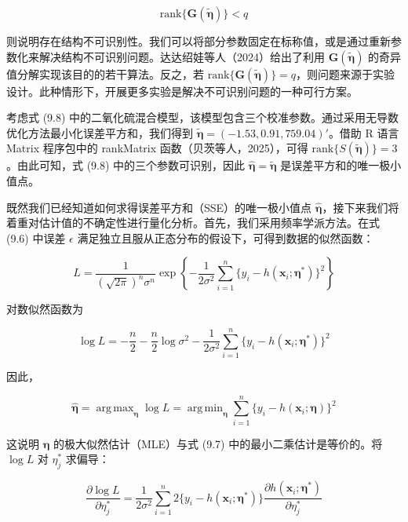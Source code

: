 \documentclass{ctexart}
\DeclareMathOperator*{\argmin}{arg\,min}
\DeclareMathOperator*{\argmax}{arg\,max}
\begin{document}
\begin{equation*}
\mathrm{rank}\{\boldsymbol{G}(\widetilde{\boldsymbol{\eta}})\}<q
\end{equation*}

则说明存在结构不可识别性。我们可以将部分参数固定在标称值，或是通过重新参数化来解决结构不可识别问题。达达绍娃等人（2024）给出了利用 $\boldsymbol{G}(\widetilde{\boldsymbol{\eta}})$ 的奇异值分解实现该目的的若干算法。反之，若 $\mathrm{rank}\{\boldsymbol{G}(\widetilde{\boldsymbol{\eta}})\}=q$，则问题来源于实验设计。此种情形下，开展更多实验是解决不可识别问题的一种可行方案。

考虑式 (9.8) 中的二氧化硫混合模型，该模型包含三个校准参数。通过采用无导数优化方法最小化误差平方和，我们得到 $\widetilde{\boldsymbol{\eta}}=(-1.53,0.91,759.04)'$。借助 R 语言 Matrix 程序包中的 rankMatrix 函数（贝茨等人，2025），可得 $\mathrm{rank}\{S(\widetilde{\boldsymbol{\eta}})\}=3$。由此可知，式 (9.8) 中的三个参数可识别，因此 $\hat{\boldsymbol{\eta}}=\widetilde{\boldsymbol{\eta}}$ 是误差平方和的唯一极小值点。

既然我们已经知道如何求得误差平方和（SSE）的唯一极小值点 $\widehat{\boldsymbol{\eta}}$，接下来我们将着重对估计值的不确定性进行量化分析。首先，我们采用频率学派方法。在式 (9.6) 中误差 $\epsilon$ 满足独立且服从正态分布的假设下，可得到数据的似然函数：

\begin{equation*}
L=\frac{1}{(\sqrt{2\pi})^n\sigma^n}\exp\left\{-\frac{1}{2\sigma^2}\sum_{i=1}^{n}\{y_i-h(\boldsymbol{x}_i;\boldsymbol{\eta}^*)\}^2\right\}
\end{equation*}

对数似然函数为

\begin{equation*}
\log L=-\frac{n}{2}-\frac{n}{2}\log\sigma^2-\frac{1}{2\sigma^2}\sum_{i=1}^{n}\{y_i-h(\boldsymbol{x}_i;\boldsymbol{\eta}^*)\}^2
\end{equation*}

因此，

\begin{equation*}
\widehat{\boldsymbol{\eta}}=\argmax_{\boldsymbol{\eta}}\log L=\argmin_{\boldsymbol{\eta}}\sum_{i=1}^{n}\{y_i-h(\boldsymbol{x}_i;\boldsymbol{\eta})\}^2
\end{equation*}

这说明 $\boldsymbol{\eta}$ 的极大似然估计（MLE）与式 (9.7) 中的最小二乘估计是等价的。将 $\log L$ 对 $\eta_j^*$ 求偏导：

\begin{equation*}
\frac{\partial\log L}{\partial\eta_j^*}=\frac{1}{2\sigma^2}\sum_{i=1}^{n}2\{y_i-h(\boldsymbol{x}_i;\boldsymbol{\eta}^*)\}\frac{\partial h(\boldsymbol{x}_i;\boldsymbol{\eta}^*)}{\partial\eta_j^*}
\end{equation*}
\end{document}
